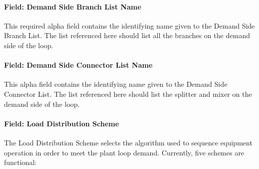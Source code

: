\paragraph{Field: Demand Side Branch List Name}\label{field-demand-side-branch-list-name}

This required alpha field contains the identifying name given to the Demand Side Branch List. The list referenced here should list all the branches on the demand side of the loop.

\paragraph{Field: Demand Side Connector List Name}\label{field-demand-side-connector-list-name}

This alpha field contains the identifying name given to the Demand Side Connector List. The list referenced here should list the splitter and mixer on the demand side of the loop.

\paragraph{Field: Load Distribution Scheme}\label{field-load-distribution-scheme-000}

The Load Distribution Scheme selects the algorithm used to sequence equipment operation in order to meet the plant loop demand. Currently, five schemes are functional:

